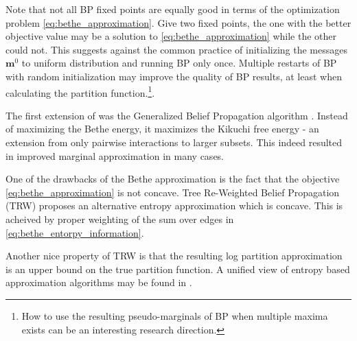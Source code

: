 Note that not all BP fixed points are equally good in terms of the optimization problem \eqref{eq:bethe_approximation}.
Give two fixed points, the one with the better objective value may be a solution to \eqref{eq:bethe_approximation} while the other could not.
This suggests against the common practice of initializing the messages $\boldsymbol{m}^0$ to uniform distribution and running BP only once.
Multiple restarts of BP with random initialization may improve the quality of BP results, at least when calculating the partition function.\footnote{How to use the resulting pseudo-marginals of BP when multiple maxima exists can be an interesting research direction.}.

The first extension of  was the Generalized Belief Propagation algorithm \cite{yedidia2000generalized}. 
Instead of maximizing the Bethe energy, it maximizes the Kikuchi free energy - an extension from only pairwise interactions to larger subsets. This 
indeed resulted in improved marginal approximation in many cases.


One of the drawbacks of the Bethe approximation is the fact that the objective \eqref{eq:bethe_approximation} is not concave.
Tree Re-Weighted Belief Propagation (TRW) \cite{wainwright2003tree} proposes an alternative entropy approximation which is concave.
This is acheived by proper weighting of the sum over edges in \eqref{eq:bethe_entorpy_information}.
Another nice property of TRW is that the resulting log partition approximation is an upper bound on the true partition function. 
A unified view of entropy based approximation algorithms may be found in \cite{meshi2009convexifying}.

